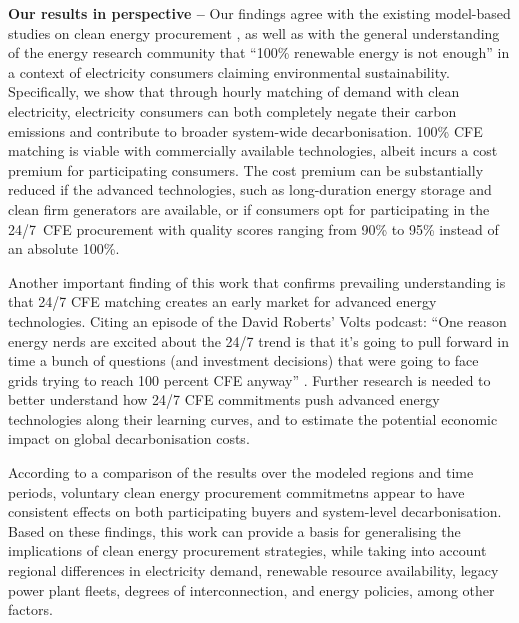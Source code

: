 \textbf{Our results in perspective --} Our findings agree with the existing model-based studies on clean energy procurement \cite{xu-247CFE-SSRN,ieaAdvancingDecarbonisationClean2022,peninsula-report247}, as well as with the general understanding of the energy research community that \enquote{100\% renewable energy is not enough} \cite{chalendar-2019} in a context of electricity consumers claiming environmental sustainability. 
Specifically, we show that through hourly matching of demand with clean electricity, electricity consumers can both completely negate their carbon emissions and contribute to broader system-wide decarbonisation. 
100\% CFE matching is viable with commercially available technologies, albeit incurs a cost premium for participating consumers.
The cost premium can be substantially reduced if the advanced technologies, such as long-duration energy storage and clean firm generators are available, or if consumers opt for participating in the 24/7~CFE procurement with quality scores ranging from 90\% to 95\% instead of an absolute 100\%.

Another important finding of this work that confirms prevailing understanding is that 24/7 CFE matching creates an early market for advanced energy technologies. Citing an episode of the David Roberts' Volts podcast: \enquote{One reason energy nerds are excited about the 24/7 trend is that it's going to pull forward in time a bunch of questions (and investment decisions) that were going to face grids trying to reach 100 percent CFE anyway} \cite{roberts-intro247CFE}. Further research is needed to better understand how 24/7 CFE commitments push advanced energy technologies along their learning curves, and to estimate the potential economic impact on global decarbonisation costs.

According to a comparison of the results over the modeled regions and time periods, voluntary clean energy procurement commitmetns appear to have consistent effects on both participating buyers and system-level decarbonisation.
Based on these findings, this work can provide a basis for generalising the implications of clean energy procurement strategies, while taking into account regional differences in electricity demand, renewable resource availability, legacy power plant fleets, degrees of interconnection, and energy policies, among other factors.


